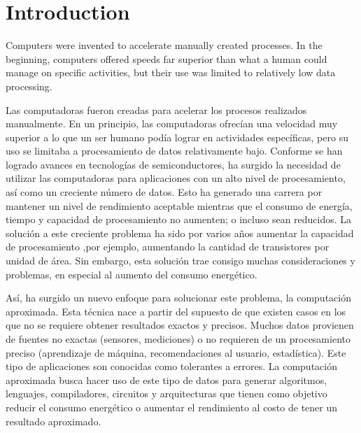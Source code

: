 
\chapter{Introduction}
\label{chp:intro}

Computers were invented to accelerate manually created processes. In the beginning, computers
offered speeds far superior than what a human could manage on specific activities, but their use
was limited to relatively low data processing. 

Las computadoras fueron creadas para acelerar los procesos realizados manualmente. En
un principio, las computadoras ofrecían una velocidad muy superior a lo que un ser humano podía lograr
en actividades específicas, pero su uso se limitaba a procesamiento de datos relativamente bajo.
Conforme se han logrado avances en tecnologías de semiconductores, ha surgido la necesidad de utilizar
las computadoras para aplicaciones con un alto nivel de procesamiento, así como un creciente número
de datos. Esto ha generado una carrera por mantener un nivel de rendimiento aceptable mientras que el
consumo de energía, tiempo y capacidad de procesamiento no aumenten; o incluso sean reducidos. La
solución a este creciente problema ha sido por varios años aumentar la capacidad de procesamiento
,por ejemplo, aumentando la cantidad de transistores por unidad de área. Sin embargo, esta solución
trae consigo muchas consideraciones y problemas, en especial al aumento del consumo energético.


Así, ha surgido un nuevo enfoque para solucionar este problema, la computación aproximada. Esta
técnica nace a partir del supuesto de que existen casos en los que no se requiere obtener resultados exactos y
precisos. Muchos datos provienen de fuentes no exactas (sensores, mediciones) o no requieren de un
procesamiento preciso (aprendizaje de máquina, recomendaciones al usuario, estadística). 
Este tipo de aplicaciones son conocidas como tolerantes a errores. La computación aproximada busca hacer 
uso de este tipo de datos para generar algoritmos, lenguajes, compiladores, circuitos y arquitecturas 
que tienen como objetivo reducir el consumo energético o aumentar el rendimiento al costo de tener un resultado aproximado.

